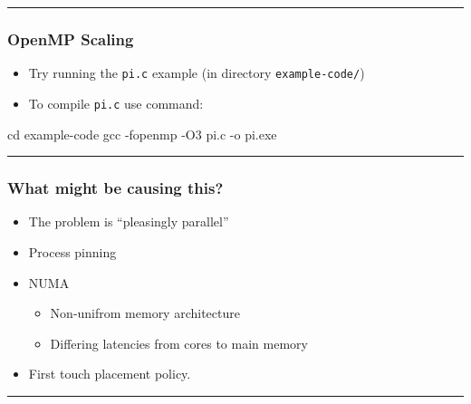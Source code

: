 \documentclass[
  letterpaper,
  DIV=11,
  numbers=noendperiod]{scrartcl}
\newenvironment{Shaded}{\begin{snugshade}}{\end{snugshade}}
\newcommand{\AttributeTok}[1]{\textcolor[rgb]{0.40,0.45,0.13}{#1}}
\newcommand{\BuiltInTok}[1]{\textcolor[rgb]{0.00,0.23,0.31}{#1}}
\newcommand{\FunctionTok}[1]{\textcolor[rgb]{0.28,0.35,0.67}{#1}}
\newcommand{\NormalTok}[1]{\textcolor[rgb]{0.00,0.23,0.31}{#1}}
\providecommand{\tightlist}{%
  \setlength{\itemsep}{0pt}\setlength{\parskip}{0pt}}
\begin{document}
\begin{center}\rule{0.5\linewidth}{0.5pt}\end{center}

\subsubsection{OpenMP Scaling}\label{openmp-scaling}

\begin{itemize}
\tightlist
\item
  Try running the \texttt{pi.c} example (in directory
  \texttt{example-code/})
\item
  To compile \texttt{pi.c} use command:
\end{itemize}

\begin{Shaded}
\begin{Highlighting}[]
\BuiltInTok{cd}\NormalTok{ example{-}code}
\FunctionTok{gcc} \AttributeTok{{-}fopenmp} \AttributeTok{{-}O3}\NormalTok{ pi.c }\AttributeTok{{-}o}\NormalTok{ pi.exe}
\end{Highlighting}
\end{Shaded}

\begin{center}\rule{0.5\linewidth}{0.5pt}\end{center}

\subsubsection{What might be causing
this?}\label{what-might-be-causing-this}

\begin{itemize}
\tightlist
\item
  The problem is ``pleasingly parallel''
\item
  Process pinning
\item
  NUMA

  \begin{itemize}
  \tightlist
  \item
    Non-unifrom memory architecture
  \item
    Differing latencies from cores to main memory
  \end{itemize}
\item
  First touch placement policy.
\end{itemize}

\begin{center}\rule{0.5\linewidth}{0.5pt}\end{center}
\end{document}
